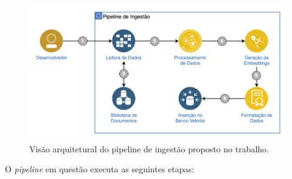 \documentclass[a4paper, 12pt]{article}
\begin{document}
    \begin{figure}
        \includegraphics[width=\textwidth,height=0.9\textheight,keepaspectratio]{architecture-pipeline.png}
        \centering
        \caption{Visão arquitetural do pipeline de ingestão proposto no trabalho.}
        \centering
        \label{fig:pipeline_scheme}
    \end{figure}
    
    O \textit{pipeline} em questão executa as seguintes etapas: 
    
\end{document}
